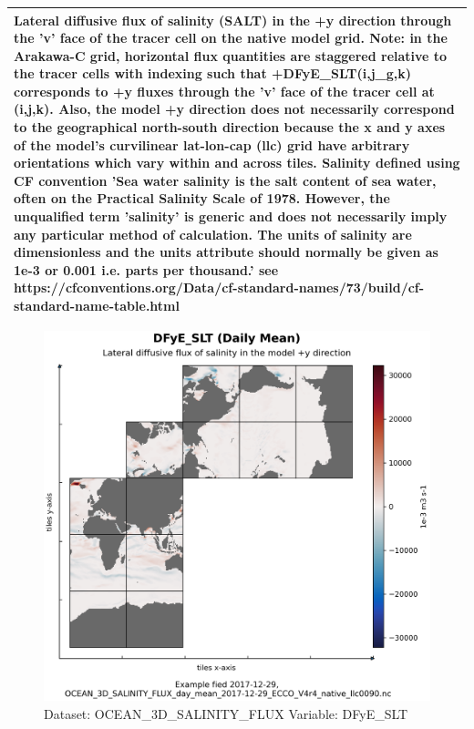 \begin{longtable}{|p{}|p{}|p{}|p{}|}
\multicolumn{4}{|p{1\textwidth}|}{Lateral diffusive flux of salinity (SALT) in the +y direction through the 'v' face of the tracer cell on the native model grid. Note: in the Arakawa-C grid, horizontal flux quantities are staggered relative to the tracer cells with indexing such that +DFyE\_SLT(i,j\_g,k) corresponds to +y fluxes through the 'v' face of the tracer cell at (i,j,k). Also, the model +y direction does not necessarily correspond to the geographical north-south direction because the x and y axes of the model's curvilinear lat-lon-cap (llc) grid have arbitrary orientations which vary within and across tiles. Salinity defined using CF convention 'Sea water salinity is the salt content of sea water, often on the Practical Salinity Scale of 1978. However, the unqualified term 'salinity' is generic and does not necessarily imply any particular method of calculation. The units of salinity are dimensionless and the units attribute should normally be given as 1e-3 or 0.001 i.e. parts per thousand.' see https://cfconventions.org/Data/cf-standard-names/73/build/cf-standard-name-table.html} \\ \hline
\end{longtable}

\begin{figure}[H]
\centering
\includegraphics[width=\textwidth]{../images/plots/native_plots/Ocean_Three-Dimensional_Salinity_Fluxes/DFyE_SLT.png}
\caption{Dataset: OCEAN\_3D\_SALINITY\_FLUX Variable: DFyE\_SLT}
\label{tab:table-OCEAN_3D_SALINITY_FLUX_DFyE_SLT-Plot}
\end{figure}
\pagebreak
